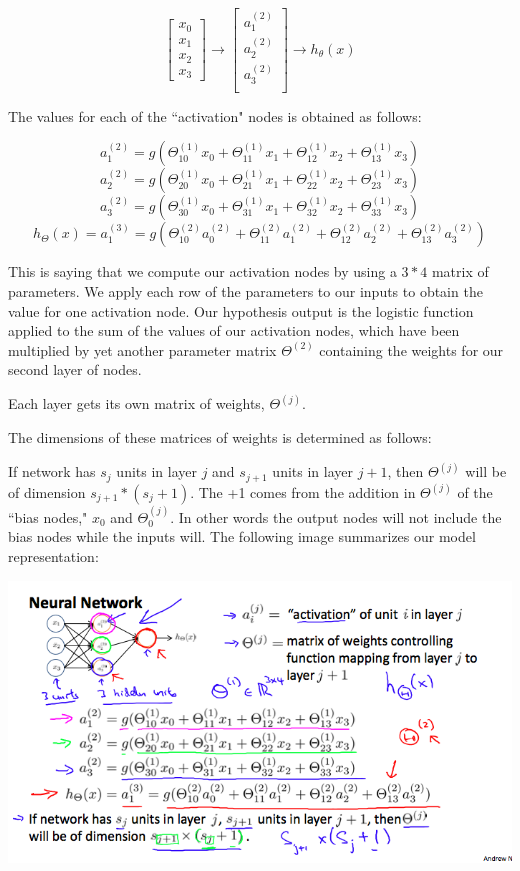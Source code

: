 \documentclass[UTF8]{article}
\begin{document}
\[\begin{bmatrix}x_0 \\ x_1 \\ x_2 \\ x_3\end{bmatrix}\rightarrow\begin{bmatrix}a_1^{(2)} \\ a_2^{(2)} \\ a_3^{(2)} \\ \end{bmatrix}\rightarrow h_\theta(x)\]

The values for each of the ``activation" nodes is obtained as follows:

\[ a_1^{(2)} = g(\Theta_{10}^{(1)}x_0 + \Theta_{11}^{(1)}x_1 + \Theta_{12}^{(1)}x_2 + \Theta_{13}^{(1)}x_3) \]
\[ a_2^{(2)} = g(\Theta_{20}^{(1)}x_0 + \Theta_{21}^{(1)}x_1 + \Theta_{22}^{(1)}x_2 + \Theta_{23}^{(1)}x_3) \]
\[ a_3^{(2)} = g(\Theta_{30}^{(1)}x_0 + \Theta_{31}^{(1)}x_1 + \Theta_{32}^{(1)}x_2 + \Theta_{33}^{(1)}x_3) \]
\[ h_\Theta(x) = a_1^{(3)} = g(\Theta_{10}^{(2)}a_0^{(2)} + \Theta_{11}^{(2)}a_1^{(2)} + \Theta_{12}^{(2)}a_2^{(2)} + \Theta_{13}^{(2)}a_3^{(2)}) \]

This is saying that we compute our activation nodes by using a $3*4$ matrix of parameters. We apply each row of the parameters to our inputs to obtain the value for one activation node. Our hypothesis output is the logistic function applied to the sum of the values of our activation nodes, which have been multiplied by yet another parameter matrix $\Theta^{(2)}$ containing the weights for our second layer of nodes.

Each layer gets its own matrix of weights, $\Theta^{(j)}$.

The dimensions of these matrices of weights is determined as follows:

If network has $s_j$ units in layer $j$ and $s_{j+1}$ units in layer $j+1$, then $\Theta^{(j)}$ will be of dimension $s_{j+1}*(s_j+1)$.
The +1 comes from the addition in $\Theta^{(j)}$ of the ``bias nodes," $x_0$ and $\Theta^{(j)}_0$. In other words the output nodes will not include the bias nodes while the inputs will. The following image summarizes our model representation:

\includegraphics[width = .8\textwidth]{NotePics/8_1_1.png}
\end{document}

